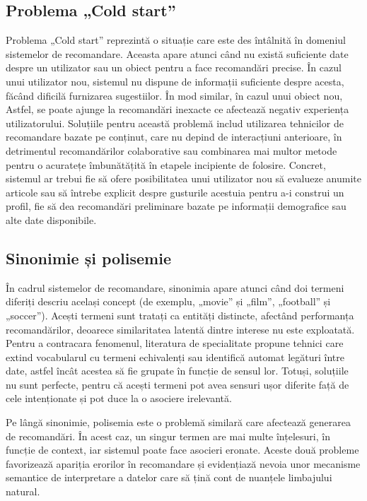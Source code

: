 \subsection{Problema „Cold start”}
\label{subsec:ch3sec4sub1}
Problema „Cold start”\cite{lika2014facing} reprezintă o situație care este des întâlnită în domeniul sistemelor de recomandare. 
Aceasta apare atunci când nu există suficiente date despre un utilizator sau un obiect pentru a face recomandări precise.
În cazul unui utilizator nou, sistemul nu dispune de informații suficiente despre acesta, făcând dificilă furnizarea sugestiilor.
În mod similar, în cazul unui obiect nou, 
Astfel, se poate ajunge la recomandări inexacte ce afectează negativ experiența utilizatorului.
Soluțiile pentru această problemă includ utilizarea tehnicilor de recomandare bazate pe conținut, care nu depind de interacțiuni anterioare, 
în detrimentul recomandărilor colaborative sau combinarea mai multor metode pentru o acuratețe îmbunătățită în etapele incipiente de folosire.
Concret, sistemul ar trebui fie să ofere posibilitatea unui utilizator nou să evalueze anumite articole sau să întrebe explicit despre gusturile acestuia pentru a-i construi un profil, 
fie să dea recomandări preliminare bazate pe informații demografice sau alte date disponibile\cite{kumar2018recommendation}.


\subsection{Sinonimie și polisemie}
\label{subsec:ch3sec4sub2}
În cadrul sistemelor de recomandare, sinonimia apare atunci când doi termeni diferiți descriu același concept (de exemplu, „movie” și „film”, „football” și „soccer”).
Acești termeni sunt tratați ca entități distincte, afectând performanța recomandărilor, deoarece similaritatea latentă dintre interese nu este exploatată.
Pentru a contracara fenomenul, literatura de specialitate propune tehnici care extind vocabularul cu termeni echivalenți sau identifică automat legături între date, astfel încât acestea să fie grupate în funcție de sensul lor.
Totuși, soluțiile nu sunt perfecte, pentru că acești termeni pot avea sensuri ușor diferite față de cele intenționate și pot duce la o asociere irelevantă\cite{mansur2017review}.
\par
Pe lângă sinonimie, polisemia este o problemă similară care afectează generarea de recomandări. În acest caz, un singur termen are mai multe înțelesuri, în funcție de context, iar sistemul poate face asocieri eronate.
Aceste două probleme favorizează apariția erorilor în recomandare și evidențiază nevoia unor mecanisme semantice de interpretare a datelor care să țină cont de nuanțele limbajului natural\cite{lops2011content}.

